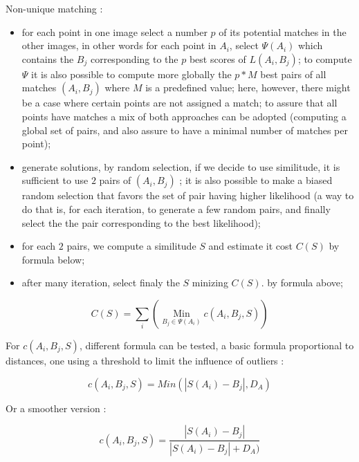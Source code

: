 Non-unique matching :
\begin{itemize}
   \item  for each point in one image select a number $p$ of its potential matches in the other images, in other words for each point in  $A_i$, select 
            $\Psi (A_i) $ which contains the  $B_j$ corresponding to the $p$
          best scores of $L(A_i,B_j)$; to compute $\Psi$ it is also possible to compute more globally the
          $p * M$ best pairs of all matches $(A_i,B_j)$ where $M$ is a predefined value; here, however, there might be a case where certain points are not assigned a match; to assure that all points have matches a mix of
          both approaches can be adopted (computing a global set of pairs, and also assure to have a minimal
          number of matches per point);

   \item generate solutions, by random selection, if we decide to use similitude,
         it is sufficient to use $2$ pairs of $(A_i,B_j)$  ;  it is also possible to make a biased
         random selection that favors the set of pair having higher likelihood
         (a way to do that is, for each iteration, to generate a few random pairs, 
          and finally select the the pair corresponding to the best likelihood);

   \item for each $2$ pairs, we compute a similitude $S$  and estimate it cost $C(S)$
         by formula below;

   \item after many iteration, select finaly the $S$ minizing $C(S)$.
         by formula above;

\end{itemize}

\begin{equation}
     C(S) = \sum_i (\underset{B_j \in \Psi(A_i)}{\operatorname{Min}}  c(A_i,B_j,S))
\end{equation}

For $c(A_i,B_j,S)$, different formula can be tested, a basic formula proportional to distances, 
one using a threshold to limit the influence of outliers  : 

\begin{equation}
      c(A_i,B_j,S) = Min(|S(A_i)-B_j|,D_A)
\end{equation}

Or a smoother version :

\begin{equation}
      c(A_i,B_j,S) = \frac{|S(A_i)-B_j|}{|S(A_i)-B_j|+D_A)}
\end{equation}


